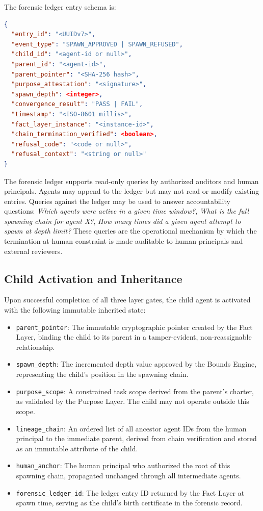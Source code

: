 The forensic ledger entry schema is:

\begin{lstlisting}[language=json, caption={Forensic Ledger Entry Schema}]
{
  "entry_id": "<UUIDv7>",
  "event_type": "SPAWN_APPROVED | SPAWN_REFUSED",
  "child_id": "<agent-id or null>",
  "parent_id": "<agent-id>",
  "parent_pointer": "<SHA-256 hash>",
  "purpose_attestation": "<signature>",
  "spawn_depth": <integer>,
  "convergence_result": "PASS | FAIL",
  "timestamp": "<ISO-8601 millis>",
  "fact_layer_instance": "<instance-id>",
  "chain_termination_verified": <boolean>,
  "refusal_code": "<code or null>",
  "refusal_context": "<string or null>"
}
\end{lstlisting}

The forensic ledger supports read-only queries by authorized auditors and human principals. Agents may append to the ledger but may not read or modify existing entries. Queries against the ledger may be used to answer accountability questions: \emph{Which agents were active in a given time window?}, \emph{What is the full spawning chain for agent X?}, \emph{How many times did a given agent attempt to spawn at depth limit?} These queries are the operational mechanism by which the termination-at-human constraint is made auditable to human principals and external reviewers.

\subsection{Child Activation and Inheritance}

Upon successful completion of all three layer gates, the child agent is activated with the following immutable inherited state:

\begin{itemize}
    \item \texttt{parent\_pointer}: The immutable cryptographic pointer created by the Fact Layer, binding the child to its parent in a tamper-evident, non-reassignable relationship.
    \item \texttt{spawn\_depth}: The incremented depth value approved by the Bounds Engine, representing the child's position in the spawning chain.
    \item \texttt{purpose\_scope}: A constrained task scope derived from the parent's charter, as validated by the Purpose Layer. The child may not operate outside this scope.
    \item \texttt{lineage\_chain}: An ordered list of all ancestor agent IDs from the human principal to the immediate parent, derived from chain verification and stored as an immutable attribute of the child.
    \item \texttt{human\_anchor}: The human principal who authorized the root of this spawning chain, propagated unchanged through all intermediate agents.
    \item \texttt{forensic\_ledger\_id}: The ledger entry ID returned by the Fact Layer at spawn time, serving as the child's birth certificate in the forensic record.
\end{itemize}

